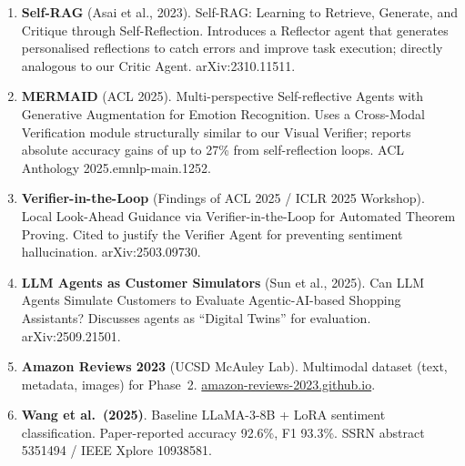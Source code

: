 \documentclass[12pt,a4paper]{article}
\begin{document}
\begin{enumerate}[leftmargin=*]

  \item \textbf{Self-RAG} (Asai et al., 2023). Self-RAG: Learning to Retrieve, Generate, and
    Critique through Self-Reflection. Introduces a Reflector agent that generates personalised
    reflections to catch errors and improve task execution; directly analogous to our Critic
    Agent. arXiv:2310.11511.

  \item \textbf{MERMAID} (ACL 2025). Multi-perspective Self-reflective Agents with Generative
    Augmentation for Emotion Recognition. Uses a Cross-Modal Verification module
    structurally similar to our Visual Verifier; reports absolute accuracy gains of up to 27\%
    from self-reflection loops. ACL Anthology 2025.emnlp-main.1252.

  \item \textbf{Verifier-in-the-Loop} (Findings of ACL 2025 / ICLR 2025 Workshop). Local
    Look-Ahead Guidance via Verifier-in-the-Loop for Automated Theorem Proving. Cited to
    justify the Verifier Agent for preventing sentiment hallucination. arXiv:2503.09730.

  \item \textbf{LLM Agents as Customer Simulators} (Sun et al., 2025). Can LLM Agents
    Simulate Customers to Evaluate Agentic-AI-based Shopping Assistants? Discusses agents
    as ``Digital Twins'' for evaluation. arXiv:2509.21501.

  \item \textbf{Amazon Reviews 2023} (UCSD McAuley Lab). Multimodal dataset (text,
    metadata, images) for Phase~2. \url{amazon-reviews-2023.github.io}.

  \item \textbf{Wang et al.\ (2025)}. Baseline LLaMA-3-8B + LoRA sentiment classification.
    Paper-reported accuracy 92.6\%, F1 93.3\%. SSRN abstract 5351494 / IEEE Xplore 10938581.

\end{enumerate}
\end{document}
